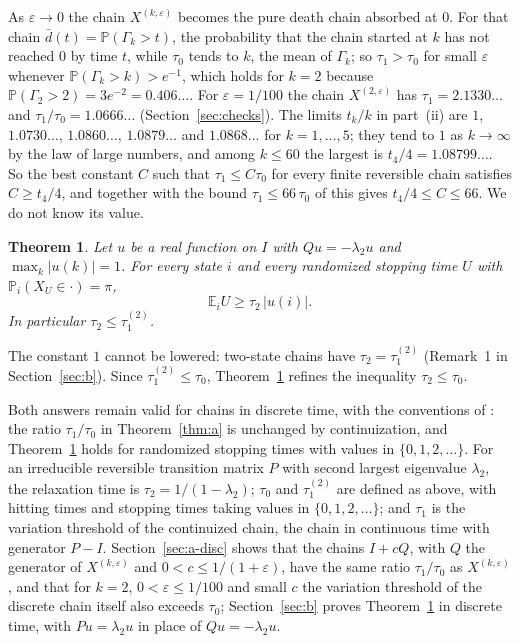 \documentclass[11pt]{amsart}
\newtheorem{theorem}{Theorem}
\numberwithin{equation}{section}
\newcommand{\Pp}{\mathbb P}
\newcommand{\E}{\mathbb E}
\newcommand{\dbar}{\bar d}
\begin{document}
As $\varepsilon\to0$ the chain $X^{(k,\varepsilon)}$ becomes the pure death chain absorbed at $0$. For that chain $\dbar(t)=\Pp(\Gamma_k>t)$, the probability that the chain started at $k$ has not reached $0$ by time $t$, while $\tau_0$ tends to $k$, the mean of $\Gamma_k$; so $\tau_1>\tau_0$ for small $\varepsilon$ whenever $\Pp(\Gamma_k>k)>e^{-1}$, which holds for $k=2$ because $\Pp(\Gamma_2>2)=3e^{-2}=0.406\ldots$. For $\varepsilon=1/100$ the chain $X^{(2,\varepsilon)}$ has $\tau_1=2.1330\ldots$ and $\tau_1/\tau_0=1.0666\ldots$ (Section~\ref{sec:checks}). The limits $t_k/k$ in part~(ii) are $1$, $1.0730\ldots$, $1.0860\ldots$, $1.0879\ldots$ and $1.0868\ldots$ for $k=1,\dots,5$; they tend to $1$ as $k\to\infty$ by the law of large numbers, and among $k\le60$ the largest is $t_4/4=1.08799\ldots$. So the best constant $C$ such that $\tau_1\le C\tau_0$ for every finite reversible chain satisfies $C\ge t_4/4$, and together with the bound $\tau_1\le66\,\tau_0$ of \cite[Lemma~4.15]{AF} this gives $t_4/4\le C\le66$. We do not know its value.

\begin{theorem}\label{thm:b}
Let $u$ be a real function on $I$ with $Qu=-\lambda_2u$ and $\max_k|u(k)|=1$. For every state $i$ and every randomized stopping time $U$ with $\Pp_i(X_U\in\cdot)=\pi$,
\[
\E_iU\ge\tau_2\,|u(i)|.
\]
In particular $\tau_2\le\tau_1^{(2)}$.
\end{theorem}

The constant $1$ cannot be lowered: two-state chains have $\tau_2=\tau_1^{(2)}$ (Remark~1 in Section~\ref{sec:b}). Since $\tau_1^{(2)}\le\tau_0$, Theorem~\ref{thm:b} refines the inequality $\tau_2\le\tau_0$.

Both answers remain valid for chains in discrete time, with the conventions of \cite[(3.39) and Section~4.3.1]{AF}: the ratio $\tau_1/\tau_0$ in Theorem~\ref{thm:a} is unchanged by continuization, and Theorem~\ref{thm:b} holds for randomized stopping times with values in $\{0,1,2,\dots\}$. For an irreducible reversible transition matrix $P$ with second largest eigenvalue $\lambda_2$, the relaxation time is $\tau_2=1/(1-\lambda_2)$; $\tau_0$ and $\tau_1^{(2)}$ are defined as above, with hitting times and stopping times taking values in $\{0,1,2,\dots\}$; and $\tau_1$ is the variation threshold of the continuized chain, the chain in continuous time with generator $P-I$. Section~\ref{sec:a-disc} shows that the chains $I+cQ$, with $Q$ the generator of $X^{(k,\varepsilon)}$ and $0<c\le1/(1+\varepsilon)$, have the same ratio $\tau_1/\tau_0$ as $X^{(k,\varepsilon)}$, and that for $k=2$, $0<\varepsilon\le1/100$ and small $c$ the variation threshold of the discrete chain itself also exceeds $\tau_0$; Section~\ref{sec:b} proves Theorem~\ref{thm:b} in discrete time, with $Pu=\lambda_2u$ in place of $Qu=-\lambda_2u$.
\end{document}
